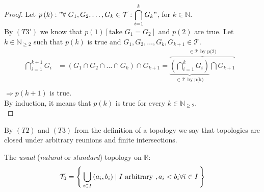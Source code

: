 \documentclass[a4paper,12pt]{report}
\begin{document}
\begin{proof}
\tcbox[on line,size=fbox]{$\Leftarrow$}

Let $p\left(k\right): "\forall\; G_1, G_2, \dots, G_k \in \mathcal{T}: \displaystyle\bigcap_{i = 1}^{k} G_k"$, for $k \in\mathbb{N}$. \\
By $\left(T3'\right)$ we know that $p\left(1\right)\left[\text{take } G_1 = G_2\right]$ and $p(2)$ are true. Let $k \in\mathbb{N}_{\geq 2}$ such that $p(k)$ is true and $G_1,G_2, \dots, G_k, G_{k+1} \in \mathcal{T}$.
\begin{align*}
\bigcap_{i = 1}^{k + 1} G_i  & = \left(G_1 \cap G_2 \cap \dots \cap G_k\right) \cap G_{k+1}  = \overbrace{\underbrace{\left(\bigcap_{i=1}^k G_i\right)}_{\in\mathcal{T}\text{ by p(k)}} \bigcap G_{k + 1}}^{\in\mathcal{T} \text{ by p(2)}}&\\
\end{align*}
$\Rightarrow p(k + 1)$ is true.\\
By induction, it means that $p(k)$ is true for every $k \in\mathbb{N}_{\geq 2}$.\\
\end{proof}


\mr
{
By $\left(T2\right)$ and $\left(T3\right)$ from the definition of a topology we say that topologies are closed under arbitrary reunions and finite intersections.
}

\me
{
The \emph{usual} (\emph{natural} or \emph{standard}) topology on $\mathbb{R}$:
\[\mathcal{T}_0 = \left\lbrace\, \bigcup_{i\in I}\left(a_i, b_i\right) \mid I \text{ arbitrary }, a_i < b_i \forall i \in I \, \right\rbrace \]
}
\end{document}
